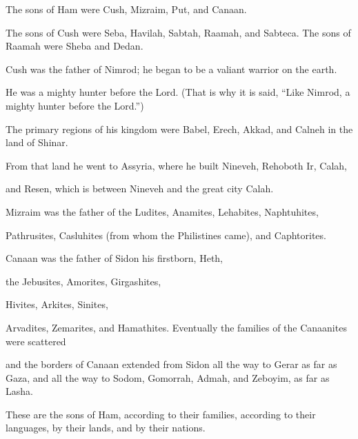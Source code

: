 \begin{scripture}
 The sons of Ham were Cush, Mizraim, Put, and Canaan.
 The sons of Cush were Seba, Havilah, Sabtah, Raamah, and Sabteca. The sons of Raamah were Sheba and Dedan.
\everypar{}

 Cush was the father of Nimrod; he began to be a valiant warrior on the earth.
 He was a mighty hunter before the Lord. (That is why it is said, ``Like Nimrod, a mighty hunter before the Lord.'')
 The primary regions of his kingdom were Babel, Erech, Akkad, and Calneh in the land of Shinar.
 From that land he went to Assyria, where he built Nineveh, Rehoboth Ir, Calah,
 and Resen, which is between Nineveh and the great city Calah.
\everypar{}

 Mizraim was the father of the Ludites, Anamites, Lehabites, Naphtuhites,
 Pathrusites, Casluhites (from whom the Philistines came), and Caphtorites.
\everypar{}

 Canaan was the father of Sidon his firstborn, Heth,
 the Jebusites, Amorites, Girgashites,
 Hivites, Arkites, Sinites,
 Arvadites, Zemarites, and Hamathites. Eventually the families of the Canaanites were scattered
 and the borders of Canaan extended from Sidon all the way to Gerar as far as Gaza, and all the way to Sodom, Gomorrah, Admah, and Zeboyim, as far as Lasha.
 These are the sons of Ham, according to their families, according to their languages, by their lands, and by their nations.
\everypar{}


\end{scripture}
